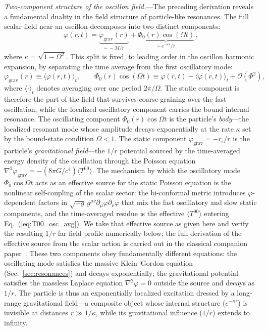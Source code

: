 \documentclass[aps,prd,onecolumn,superscriptaddress,nofootinbib,showpacs,12pt,notitlepage]{revtex4-2}
\newcommand{\rs}{r_{\mathrm{s}}}
\renewcommand{\order}[1]{\mathcal{O}\!\left(#1\right)}
\begin{document}
\textit{Two-component structure of the oscillon
field.}---The preceding derivation reveals a fundamental
duality in the field structure of particle-like
resonances.  The full scalar field near an oscillon
decomposes into two distinct components:
\begin{equation}\label{eq:two_component}
  \varphi(r,t) = \underbrace{\varphi_{\mathrm{grav}}(r)}_{\sim\,-M/r}
  + \underbrace{\Phi_0(r)\cos(\Omega t)}_{\sim\,e^{-\kappa r}/r}\,,
\end{equation}
where $\kappa = \sqrt{1 - \Omega^2}$.  This split is fixed,
to leading order in the oscillon harmonic expansion, by
separating the time average from the first oscillatory mode:
\begin{equation}
  \varphi_{\mathrm{grav}}(r) \equiv \langle \varphi(r,t)\rangle_t,
  \qquad
  \Phi_0(r)\cos(\Omega t)
  \equiv \varphi(r,t) - \langle \varphi(r,t)\rangle_t
  + \order{\Phi^2},
\end{equation}
where $\langle\cdot\rangle_t$ denotes averaging over one
period $2\pi/\Omega$.  The static component is therefore the
part of the field that survives coarse-graining over the fast
oscillation, while the localized oscillatory component carries
the bound internal resonance.
The oscillating component $\Phi_0(r)\cos\Omega t$ is the
particle's \emph{body}---the localized resonant mode whose
amplitude decays exponentially at the rate $\kappa$ set
by the bound-state condition $\Omega < 1$.  The static
component $\varphi_{\mathrm{grav}} = -\rs/r$ is the
particle's \emph{gravitational field}---the $1/r$ potential
sourced by the time-averaged energy density of the
oscillation through the Poisson equation
$\nabla^{2}\varphi_{\mathrm{grav}}
= -(8\pi G/c^{4})\langle T^{00}\rangle$.
The mechanism by which the oscillatory mode $\Phi_0\cos\Omega t$
acts as an effective source for the static Poisson equation is
the nonlinear self-coupling of the scalar sector: the bi-conformal
metric introduces $\varphi$-dependent factors in
$\sqrt{-g}\,g^{\mu\nu}\partial_\mu\varphi\partial_\nu\varphi$ that
mix the fast oscillatory and slow static components, and the
time-averaged residue is the effective $\langle T^{00}\rangle$
entering Eq.~(\ref{eq:T00_osc_avg}).  We take that effective
source as given here and verify the resulting $1/r$ far-field
profile numerically below; the full derivation of the effective
source from the scalar action is carried out in the classical
companion paper~\cite{Lotishvili2026}.
These two components obey fundamentally different
equations: the oscillating mode satisfies the massive
Klein--Gordon equation (Sec.~\ref{sec:resonances}) and
decays exponentially; the gravitational potential
satisfies the massless Laplace equation $\nabla^{2}\varphi = 0$
outside the source and decays as $1/r$.  The particle is
thus an exponentially localized excitation dressed by a
long-range gravitational field---a composite object whose
internal structure ($e^{-\kappa r}$) is invisible at
distances $r \gg 1/\kappa$, while its gravitational
influence ($1/r$) extends to infinity.
\end{document}
